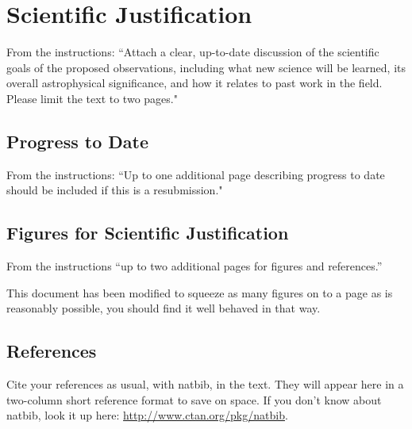 \documentclass[edit]{Keck}
\begin{document}
\section{Scientific Justification} %
\label{sec:scientific_justification}

From the instructions: ``Attach a clear, up-to-date discussion of the scientific goals of the proposed observations, including what new science will be learned, its overall astrophysical significance, and how it relates to past work in the field. Please limit the text to two pages."

\pagebreak[4]
\subsection{Progress to Date} %
\label{sub:progress_to_date}

From the instructions: ``Up to one additional page describing progress to date should be included if this is a resubmission."

\newpage

\subsection{Figures for Scientific Justification} %
\label{sub:figures_for_scientific_justification}
From the instructions ``up to two additional pages for figures and references.''

This \XeLaTeX document has been modified to squeeze as many figures on to a page as is reasonably possible, you should find it well behaved in that way.

\subsection{References} %
\label{sub:references}

Cite your references as usual, with natbib, in the text. They will appear here in a two-column short reference format to save on space. If you don't know about natbib, look it up here: \url{http://www.ctan.org/pkg/natbib}.

\begin{multicols}{2}
\end{multicols}
\end{document}
